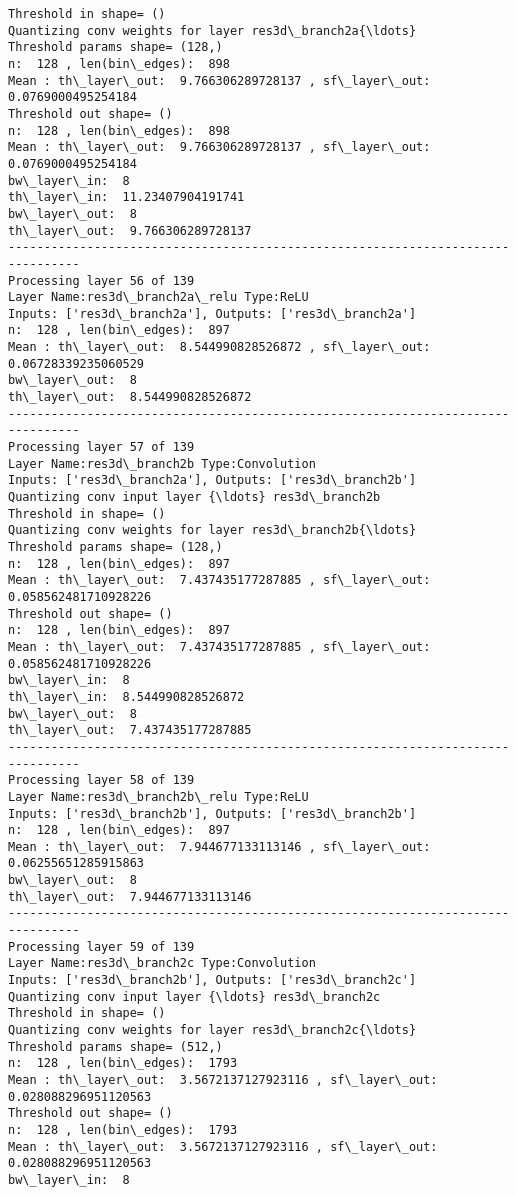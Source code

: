 \documentclass[11pt]{article}
\begin{document}
\begin{Verbatim}[commandchars=\\\{\}]
Threshold in shape= ()
Quantizing conv weights for layer res3d\_branch2a{\ldots}
Threshold params shape= (128,)
n:  128 , len(bin\_edges):  898
Mean : th\_layer\_out:  9.766306289728137 , sf\_layer\_out:  0.0769000495254184
Threshold out shape= ()
n:  128 , len(bin\_edges):  898
Mean : th\_layer\_out:  9.766306289728137 , sf\_layer\_out:  0.0769000495254184
bw\_layer\_in:  8
th\_layer\_in:  11.23407904191741
bw\_layer\_out:  8
th\_layer\_out:  9.766306289728137
--------------------------------------------------------------------------------
Processing layer 56 of 139
Layer Name:res3d\_branch2a\_relu Type:ReLU
Inputs: ['res3d\_branch2a'], Outputs: ['res3d\_branch2a']
n:  128 , len(bin\_edges):  897
Mean : th\_layer\_out:  8.544990828526872 , sf\_layer\_out:  0.06728339235060529
bw\_layer\_out:  8
th\_layer\_out:  8.544990828526872
--------------------------------------------------------------------------------
Processing layer 57 of 139
Layer Name:res3d\_branch2b Type:Convolution
Inputs: ['res3d\_branch2a'], Outputs: ['res3d\_branch2b']
Quantizing conv input layer {\ldots} res3d\_branch2b
Threshold in shape= ()
Quantizing conv weights for layer res3d\_branch2b{\ldots}
Threshold params shape= (128,)
n:  128 , len(bin\_edges):  897
Mean : th\_layer\_out:  7.437435177287885 , sf\_layer\_out:  0.058562481710928226
Threshold out shape= ()
n:  128 , len(bin\_edges):  897
Mean : th\_layer\_out:  7.437435177287885 , sf\_layer\_out:  0.058562481710928226
bw\_layer\_in:  8
th\_layer\_in:  8.544990828526872
bw\_layer\_out:  8
th\_layer\_out:  7.437435177287885
--------------------------------------------------------------------------------
Processing layer 58 of 139
Layer Name:res3d\_branch2b\_relu Type:ReLU
Inputs: ['res3d\_branch2b'], Outputs: ['res3d\_branch2b']
n:  128 , len(bin\_edges):  897
Mean : th\_layer\_out:  7.944677133113146 , sf\_layer\_out:  0.06255651285915863
bw\_layer\_out:  8
th\_layer\_out:  7.944677133113146
--------------------------------------------------------------------------------
Processing layer 59 of 139
Layer Name:res3d\_branch2c Type:Convolution
Inputs: ['res3d\_branch2b'], Outputs: ['res3d\_branch2c']
Quantizing conv input layer {\ldots} res3d\_branch2c
Threshold in shape= ()
Quantizing conv weights for layer res3d\_branch2c{\ldots}
Threshold params shape= (512,)
n:  128 , len(bin\_edges):  1793
Mean : th\_layer\_out:  3.5672137127923116 , sf\_layer\_out:  0.028088296951120563
Threshold out shape= ()
n:  128 , len(bin\_edges):  1793
Mean : th\_layer\_out:  3.5672137127923116 , sf\_layer\_out:  0.028088296951120563
bw\_layer\_in:  8

\end{Verbatim}
\end{document}
